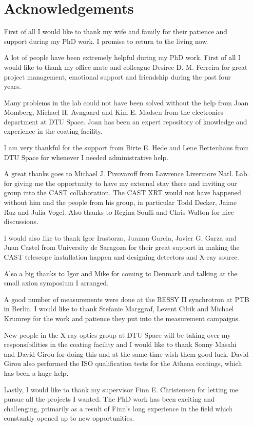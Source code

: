 \chapter{Acknowledgements}
First of all I would like to thank my wife and family for their patience and support during my PhD work. I promise to return to the living now.

A lot of people have been extremely helpful during my PhD work. First of all I would like to thank my office mate and colleague Desiree D. M. Ferreira for great project management, emotional support and friendship during the past four years.

Many problems in the lab could not have been solved without the help from Joan Momberg, Michael H. Avngaard and Kim E. Madsen from the electronics department at DTU Space. Joan has been an expert repository of knowledge and experience in the coating facility.

I am very thankful for the support from Birte E. Hede and Lene Bettenhaus from DTU Space for whenever I needed administrative help.

A great thanks goes to Michael J. Pivovaroff from Lawrence Livermore Natl. Lab. for giving me the opportunity to have my external stay there and inviting our group into the CAST collaboration. The CAST XRT would not have happened without him and the people from his group, in particular Todd Decker, Jaime Ruz and Julia Vogel. Also thanks to Regina Soufli and Chris Walton for nice discussions.

I would also like to thank Igor Irastorza, Juanan Garcia, Javier G. Garza and Juan Castel from University de Saragoza for their great support in making the CAST telescope installation happen and designing detectors and X-ray source.

Also a big thanks to Igor and Mike for coming to Denmark and talking at the small axion symposium I arranged.

A good number of measurements were done at the BESSY II synchrotron at PTB in Berlin. I would like to thank Stefanie Marggraf, Levent Cibik and Michael Krumrey for the work and patience they put into the measurement campaigns.

New people in the X-ray optics group at DTU Space will be taking over my responsibilities in the coating facility and I would like to thank Sonny Masahi and David Girou for doing this and at the same time wish them good luck. David Girou also performed the ISO qualification tests for the Athena coatings, which has been a huge help.

Lastly, I would like to thank my supervisor Finn E. Christensen for letting me pursue all the projects I wanted. The PhD work has been exciting and challenging, primarily as a result of Finn's long experience in the field which constantly opened up to new opportunities.
